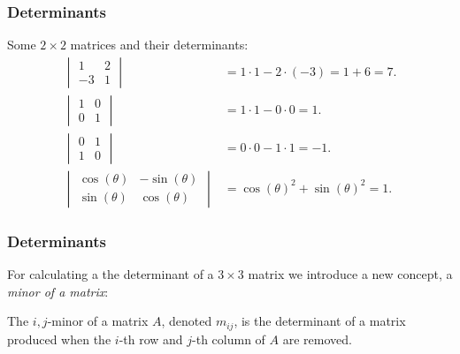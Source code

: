 \begin{frame}
  \frametitle{Determinants}
  \begin{presentation_example}
    Some $2\times2$ matrices and their determinants:
    \begin{align*}
      \begin{vmatrix}
        1 & 2\\
        -3 & 1
      \end{vmatrix} &= 1\cdot1 - 2\cdot(-3) = 1+6 = 7.\\
      \begin{vmatrix}
        1 & 0\\
        0 & 1
      \end{vmatrix} &= 1\cdot1 - 0\cdot0 = 1.\\
      \begin{vmatrix}
        0 & 1\\
        1 & 0
      \end{vmatrix} &= 0\cdot0 - 1\cdot1 = -1.\\
      \begin{vmatrix}
        \cos(\theta) & -\sin(\theta)\\
        \sin(\theta) & \cos(\theta)
      \end{vmatrix} &= \cos(\theta)^{2} + \sin(\theta)^{2} = 1.
    \end{align*}
  \end{presentation_example}
\end{frame}

\begin{frame}
  \frametitle{Determinants}
  For calculating a the determinant of a $3\times3$ matrix we introduce a new concept, a \emph{minor of a matrix}:
  \begin{presentation_definition}
    The $i,j$-minor of a  matrix $A$, denoted $m_{ij}$, is the determinant of a matrix produced when the $i$-th row and $j$-th column of $A$ are removed.
  \end{presentation_definition}
\end{frame}

